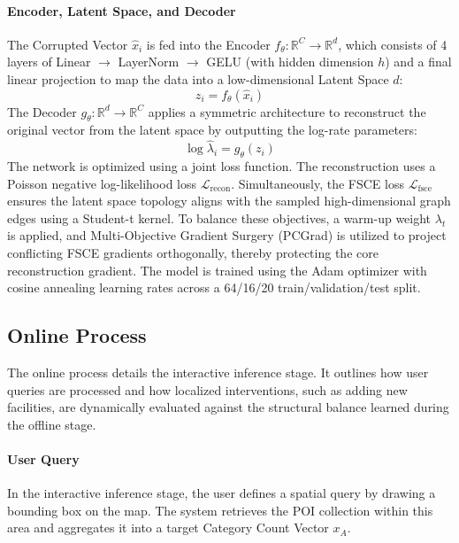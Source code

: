 \documentclass[sigconf]{acmart}
\begin{document}
\paragraph{Encoder, Latent Space, and Decoder}
The Corrupted Vector $\hat x_i$ is fed into the Encoder $f_\theta:\mathbb{R}^C\to\mathbb{R}^d$, which consists of 4 layers of Linear $\rightarrow$ LayerNorm $\rightarrow$ GELU (with hidden dimension $h$) and a final linear projection to map the data into a low-dimensional Latent Space $d$:
\begin{equation}
z_i=f_\theta(\hat x_i)
\end{equation}
The Decoder $g_\theta:\mathbb{R}^d\to\mathbb{R}^C$ applies a symmetric architecture to reconstruct the original vector from the latent space by outputting the log-rate parameters:
\begin{equation}
\log\hat\lambda_i=g_\theta(z_i)
\end{equation}
The network is optimized using a joint loss function. The reconstruction uses a Poisson negative log-likelihood loss $\mathcal{L}_{\text{recon}}$. Simultaneously, the FSCE loss $\mathcal{L}_{\text{fsce}}$ ensures the latent space topology aligns with the sampled high-dimensional graph edges using a Student-t kernel. To balance these objectives, a warm-up weight $\lambda_t$ is applied, and Multi-Objective Gradient Surgery (PCGrad) is utilized to project conflicting FSCE gradients orthogonally, thereby protecting the core reconstruction gradient. The model is trained using the Adam optimizer with cosine annealing learning rates across a 64/16/20 train/validation/test split.

\subsection{Online Process}
The online process details the interactive inference stage. It outlines how user queries are processed and how localized interventions, such as adding new facilities, are dynamically evaluated against the structural balance learned during the offline stage.

\paragraph{User Query}
In the interactive inference stage, the user defines a spatial query by drawing a bounding box on the map. The system retrieves the POI collection within this area and aggregates it into a target Category Count Vector $x_A$.
\end{document}
